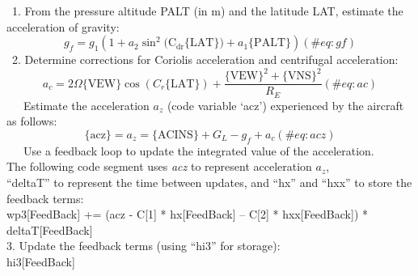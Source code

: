 \documentclass[
  english,
]{book}
\begin{document}
~1. From the pressure altitude PALT (in m) and the latitude LAT,
estimate the acceleration of gravity:\\
\begin{equation}
g_{f}=g_{1}\left(1+a_{2}\sin^{2}(\mathrm{C_{dr}\{LAT\})}+a_{1}\mathrm{\{PALT\}}\right)
(\#eq:gf)
\end{equation} ~2. Determine corrections for Coriolis
acceleration and centrifugal
acceleration:\\
\begin{equation}
a_{c}=2\Omega\mathrm{\{VEW\}}\cos(C_{r}\mathrm{\{LAT\}})+\frac{\mathrm{\{VEW\}}^{2}+\mathrm{\{VNS\}}^{2}}{R_{E}}
(\#eq:ac)
\end{equation} ~~~Estimate the acceleration \(a_{z}\) (code variable
`acz') experienced by the aircraft as follows:\\
\begin{equation}
\mathrm{\{acz\}}=a_{z}=\mathrm{\{ACINS\}}+G_{L}-g_{f}+a_{c}
(\#eq:acz)
\end{equation} ~~~Use a feedback loop to update the integrated value of
the acceleration.\\
\hspace*{0.333em}\hspace*{0.333em}\hspace*{0.333em}The following code
segment uses \emph{acz} to represent acceleration \(a_{z}\),\\
\hspace*{0.333em}\hspace*{0.333em}\hspace*{0.333em}``deltaT'' to
represent the time between updates, and ``hx'' and ``hxx'' to store the
feedback terms:\\
\hspace*{0.333em}\hspace*{0.333em}\hspace*{0.333em}\hspace*{0.333em}\hspace*{0.333em}wp3{[}FeedBack{]}
+= (acz - C{[}1{]} * hx{[}FeedBack{]} -- C{[}2{]} * hxx{[}FeedBack{]}) *
deltaT{[}FeedBack{]}\\
\hspace*{0.333em}3. Update the feedback terms (using ``hi3'' for
storage):\\
\hspace*{0.333em}\hspace*{0.333em}\hspace*{0.333em}\hspace*{0.333em}\hspace*{0.333em}hi3{[}FeedBack{]}
\end{document}

